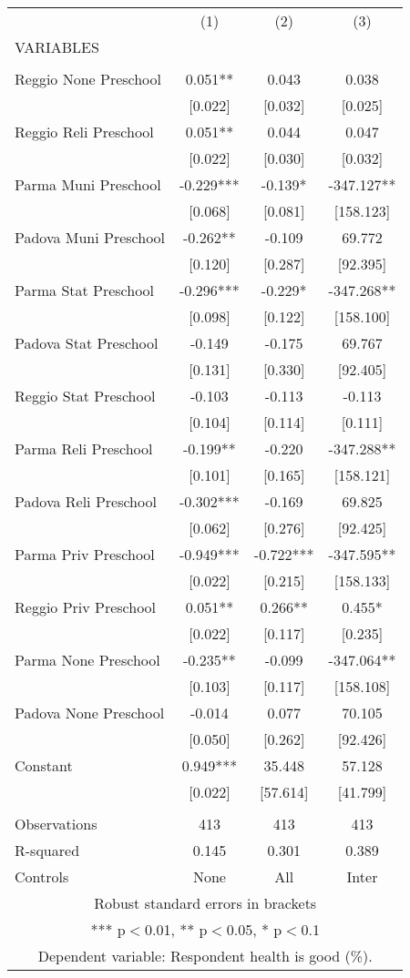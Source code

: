\begin{tabular}{lccc} \hline
 & (1) & (2) & (3) \\
VARIABLES &  &  &  \\ \hline
 &  &  &  \\
Reggio None Preschool & 0.051** & 0.043 & 0.038 \\
 & [0.022] & [0.032] & [0.025] \\
Reggio Reli Preschool & 0.051** & 0.044 & 0.047 \\
 & [0.022] & [0.030] & [0.032] \\
Parma Muni Preschool & -0.229*** & -0.139* & -347.127** \\
 & [0.068] & [0.081] & [158.123] \\
Padova Muni Preschool & -0.262** & -0.109 & 69.772 \\
 & [0.120] & [0.287] & [92.395] \\
Parma Stat Preschool & -0.296*** & -0.229* & -347.268** \\
 & [0.098] & [0.122] & [158.100] \\
Padova Stat Preschool & -0.149 & -0.175 & 69.767 \\
 & [0.131] & [0.330] & [92.405] \\
Reggio Stat Preschool & -0.103 & -0.113 & -0.113 \\
 & [0.104] & [0.114] & [0.111] \\
Parma Reli Preschool & -0.199** & -0.220 & -347.288** \\
 & [0.101] & [0.165] & [158.121] \\
Padova Reli Preschool & -0.302*** & -0.169 & 69.825 \\
 & [0.062] & [0.276] & [92.425] \\
Parma Priv Preschool & -0.949*** & -0.722*** & -347.595** \\
 & [0.022] & [0.215] & [158.133] \\
Reggio Priv Preschool & 0.051** & 0.266** & 0.455* \\
 & [0.022] & [0.117] & [0.235] \\
Parma None Preschool & -0.235** & -0.099 & -347.064** \\
 & [0.103] & [0.117] & [158.108] \\
Padova None Preschool & -0.014 & 0.077 & 70.105 \\
 & [0.050] & [0.262] & [92.426] \\
Constant & 0.949*** & 35.448 & 57.128 \\
 & [0.022] & [57.614] & [41.799] \\
 &  &  &  \\
Observations & 413 & 413 & 413 \\
R-squared & 0.145 & 0.301 & 0.389 \\
 Controls & None & All & Inter \\ \hline
\multicolumn{4}{c}{ Robust standard errors in brackets} \\
\multicolumn{4}{c}{ *** p$<$0.01, ** p$<$0.05, * p$<$0.1} \\
\multicolumn{4}{c}{ Dependent variable: Respondent health is good (\%).} \\
\end{tabular}
